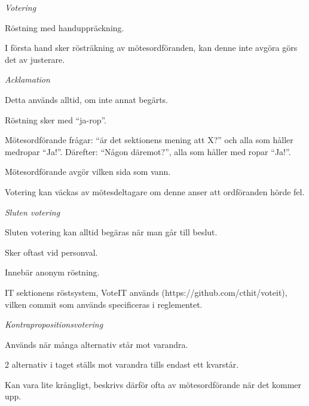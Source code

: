 \documentclass[11pt, noincludeaddress]{classes/cthit}
\let\tempone\itemize
\let\temptwo\enditemize
\renewenvironment{itemize}{\tempone\addtolength{\itemsep}{-0.3\baselineskip}}{\temptwo}
\begin{document}
\begin{itemize}
    \item \textit{Votering}
    \begin{itemize}
        \item Röstning med handuppräckning.
        \item I första hand sker rösträkning av mötesordföranden, kan denne inte avgöra görs det av justerare.
    \end{itemize}

    \item \textit{Acklamation}
    \begin{itemize}
        \item Detta används alltid, om inte annat begärts. 
        \item Röstning sker med “ja-rop”.
        \item Mötesordförande frågar: “är det sektionens mening att X?” och alla som håller medropar “Ja!”. Därefter: “Någon däremot?”, alla som håller med ropar “Ja!”.
        \item Mötesordförande avgör vilken sida som vann.
        \item Votering kan väckas av mötesdeltagare om denne anser att ordföranden hörde fel.
    \end{itemize}
    
    \item \textit{Sluten votering}
    \begin{itemize}
        \item Sluten votering kan alltid begäras när man går till beslut.
        \item Sker oftast vid personval.
        \item Innebär anonym röstning.
        \item IT sektionens röstsystem, VoteIT används (https://github.com/cthit/voteit), vilken commit som används specificeras i reglementet.
    \end{itemize}
    \item \textit{Kontrapropositionsvotering}
    \begin{itemize}
        \item Används när många alternativ står mot varandra.
        \item 2 alternativ i taget ställs mot varandra tills endast ett kvarstår.
        \item Kan vara lite krångligt, beskrivs därför ofta av mötesordförande när det kommer upp.
    \end{itemize}
\end{itemize}
\end{document}
